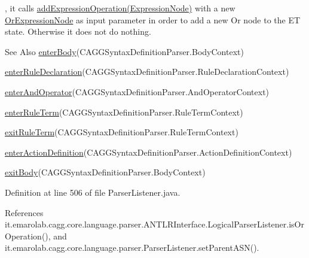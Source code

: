  , it calls \hyperlink{}{add\-Expression\-Operation(\-Expression\-Node)} with a new \hyperlink{}{Or\-Expression\-Node} as input parameter in order to add a new Or node to the E\-T state. Otherwise it does not do nothing. \begin{DoxySeeAlso}{See Also}
\hyperlink{classit_1_1emarolab_1_1cagg_1_1core_1_1language_1_1parser_1_1ParserListener_a9675dd98156b94a9e26cea3946eaa69d}{enter\-Body}(C\-A\-G\-G\-Syntax\-Definition\-Parser.\-Body\-Context) 

\hyperlink{classit_1_1emarolab_1_1cagg_1_1core_1_1language_1_1parser_1_1ParserListener_a23734ed11648eae22a037a43e8c2d007}{enter\-Rule\-Declaration}(C\-A\-G\-G\-Syntax\-Definition\-Parser.\-Rule\-Declaration\-Context) 

\hyperlink{classit_1_1emarolab_1_1cagg_1_1core_1_1language_1_1parser_1_1ParserListener_a27394515e7347376dc937974202abbc9}{enter\-And\-Operator}(C\-A\-G\-G\-Syntax\-Definition\-Parser.\-And\-Operator\-Context) 

\hyperlink{classit_1_1emarolab_1_1cagg_1_1core_1_1language_1_1parser_1_1ParserListener_ab55244dd0bc74c42338389ef4f186963}{enter\-Rule\-Term}(C\-A\-G\-G\-Syntax\-Definition\-Parser.\-Rule\-Term\-Context) 

\hyperlink{classit_1_1emarolab_1_1cagg_1_1core_1_1language_1_1parser_1_1ParserListener_a9cddde49b7fd2142b1fcd72b5d6e2c51}{exit\-Rule\-Term}(C\-A\-G\-G\-Syntax\-Definition\-Parser.\-Rule\-Term\-Context) 

\hyperlink{classit_1_1emarolab_1_1cagg_1_1core_1_1language_1_1parser_1_1ParserListener_a95c6463441d582fef5d63aea4eb13f56}{enter\-Action\-Definition}(C\-A\-G\-G\-Syntax\-Definition\-Parser.\-Action\-Definition\-Context) 

\hyperlink{classit_1_1emarolab_1_1cagg_1_1core_1_1language_1_1parser_1_1ParserListener_a4ddc07fbccb866fee058db32839fba42}{exit\-Body}(C\-A\-G\-G\-Syntax\-Definition\-Parser.\-Body\-Context) 
\end{DoxySeeAlso}


Definition at line 506 of file Parser\-Listener.\-java.



References it.\-emarolab.\-cagg.\-core.\-language.\-parser.\-A\-N\-T\-L\-R\-Interface.\-Logical\-Parser\-Listener.\-is\-Or\-Operation(), and it.\-emarolab.\-cagg.\-core.\-language.\-parser.\-Parser\-Listener.\-set\-Parent\-A\-S\-N().



